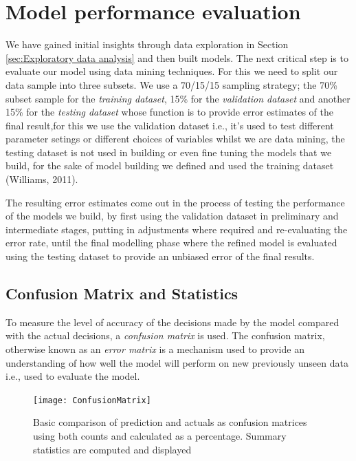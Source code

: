 \documentclass{DissertateUSU}
\begin{document}
\section{Model performance evaluation}

We have gained initial insights through data exploration in Section
\ref{sec:Exploratory data analysis} and then built models. The next
critical step is to evaluate our model using data mining techniques. For
this we need to split our data sample into three subsets. We use a
70/15/15 sampling strategy; the 70\% subset sample for the
\emph{training dataset}, 15\% for the \emph{validation dataset} and
another 15\% for the \emph{testing dataset} whose function is to provide
error estimates of the final result,for this we use the validation
dataset i.e., it's used to test different parameter setings or different
choices of variables whilst we are data mining, the testing dataset is
not used in building or even fine tuning the models that we build, for
the sake of model building we defined and used the training dataset
(Williams, 2011).\medskip    

The resulting error estimates come out in the process of testing the
performance of the models we build, by first using the validation
dataset in preliminary and intermediate stages, putting in adjustments
where required and re-evaluating the error rate, until the final
modelling phase where the refined model is evaluated using the testing
dataset to provide an unbiased error of the final results. \medskip

\singlespacing

\doublespacing

\subsection{Confusion Matrix and Statistics}

To measure the level of accuracy of the decisions made by the model
compared with the actual decisions, a \emph{confusion matrix} is used.
The confusion matrix, otherwise known as an \emph{error matrix} is a
mechanism used to provide an understanding of how well the model will
perform on new previously unseen data i.e., used to evaluate the model.

\begin{figure}
\centering
\texttt{[image: ConfusionMatrix]}
\caption[Confusion (Error) matrices]{Basic comparison of prediction and actuals as confusion matrices using both counts and calculated as a percentage. Summary statistics are computed and displayed}
\label{ConfusionMatricesAll}
\end{figure}
\end{document}
